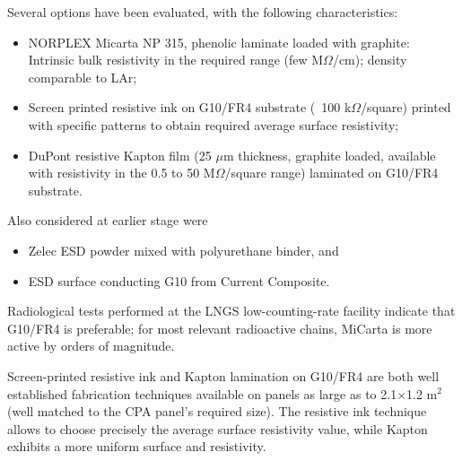 Several options have been evaluated, with the following characteristics:
\begin{itemize}	
\item NORPLEX Micarta NP 315, phenolic laminate loaded with graphite: Intrinsic bulk resistivity in the required range (few M$\Omega$/cm); density comparable to LAr;
\item Screen printed resistive ink on G10/FR4 substrate (~100 k$\Omega$/square) printed with specific patterns to obtain required average surface resistivity;
\item DuPont resistive Kapton film  (25 $\mu$m thickness, graphite loaded, available with resistivity in the 0.5 to 50 M$\Omega$/square range) laminated on G10/FR4 substrate.
\end{itemize}
Also considered at earlier stage were
\begin{itemize}	
\item Zelec ESD powder mixed with polyurethane binder, and
\item ESD surface conducting G10 from Current Composite.
\end{itemize}

 Radiological tests performed at the LNGS low-counting-rate facility indicate that G10/FR4 is preferable; for most relevant radioactive chains, MiCarta is more active by orders of magnitude.

Screen-printed resistive ink and Kapton lamination on G10/FR4 are both well established fabrication techniques available on panels as large as to 2.1$\times$1.2 m$^2$ (well matched to the CPA panel's required size). The resistive ink technique allows to choose precisely the average surface resistivity value, while Kapton exhibits a more uniform surface and resistivity. 

